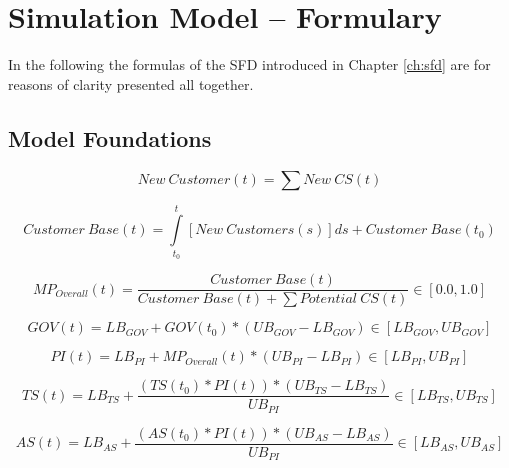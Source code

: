 \chapter{Simulation Model -- Formulary}\label{ch:app04}

In the following the formulas of the \ac{SFD} introduced in Chapter \ref{ch:sfd} are for reasons of clarity presented all together.

\section{Model Foundations}\label{ch:app04:mf}

\begin{equation}
	\mathit{New~Customer(t)} = \sum{\mathit{New~CS(t)}}
\end{equation}

\begin{equation}
	\mathit{Customer~Base(t)} = \int\limits_{t_0}^t \mathit{[New~Customers(s)]ds} + \mathit{Customer~Base(t_0)}
\end{equation}

\begin{equation}
	MP_{Overall}(t) = \frac{\mathit{Customer~Base(t)}}{\mathit{Customer~Base(t)} + \sum \mathit{Potential~CS(t)}} \in [0.0,1.0]
\end{equation}

\begin{equation}
	GOV(t) = LB_{GOV} + GOV(t_0) * (UB_{GOV} - LB_{GOV}) \in [LB_{GOV},UB_{GOV}]
\end{equation}

\begin{equation}
	PI(t) = LB_{PI} + MP_{Overall}(t) * (UB_{PI} - LB_{PI}) \in [LB_{PI},UB_{PI}]
\end{equation}

\begin{equation}
	TS(t) = LB_{TS} +  \frac{(TS(t_0) * PI(t)) * (UB_{TS} - LB_{TS})}{UB_{PI}} \in [LB_{TS},UB_{TS}]
\end{equation}

\begin{equation}
	AS(t) = LB_{AS} +  \frac{(AS(t_0) * PI(t)) * (UB_{AS} - LB_{AS})}{UB_{PI}} \in [LB_{AS},UB_{AS}]
\end{equation}

